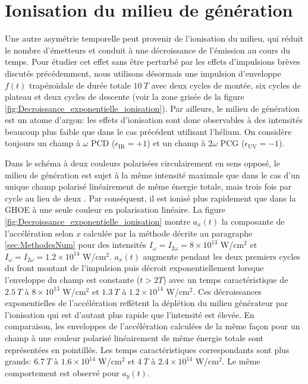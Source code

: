 \section{Ionisation du milieu de génération}
\label{sec:Ionisation}
Une autre asymétrie temporelle peut provenir de l'ionisation du milieu, qui réduit le nombre d'émetteurs et conduit à une décroissance de l'émission au cours du temps. Pour étudier cet effet sans être perturbé par les effets d'impulsions brèves discutés précédemment, nous utilisons désormais une impulsion d'enveloppe $f(t)$ trapézoïdale de durée totale $10 \: T$ avec deux cycles de montée, six cycles de plateau et deux cycles de descente (voir la zone grisée de la figure \ref{fig:Decroissance_exponentielle_ionisation}). Par ailleurs, le milieu de génération est un atome d'argon: les effets d'ionisation sont donc observables à des intensités beaucoup plus faible que dans le cas précédent utilisant l'hélium. On considère toujours un champ à $\omega$ PCD ($\epsilon_{\text{IR}} = +1$) et un champ à 2$\omega$ PCG ($\epsilon_{\text{UV}} = -1$).

Dans le schéma à deux couleurs polarisées circulairement en sens opposé, le milieu de génération est sujet à la même intensité maximale que dans le cas d'un unique champ polarisé linéairement de  même énergie totale, mais trois fois par cycle au lieu de deux . Par conséquent, il est ionisé plus rapidement que dans la GHOE à une seule couleur en polarisation linéaire. La figure \ref{fig:Decroissance_exponentielle_ionisation} montre $a_x(t)$ la composante de l'accélération selon $x$ calculée par la méthode décrite au paragraphe \ref{sec:MethodesNum} pour des intensités $I_\omega = I_{2\omega} = 8 \times 10^{13}$ W/cm$^2$ et $I_\omega = I_{2\omega} = 1.2 \times 10^{14}$ W/cm$^2$. $a_x(t)$ augmente pendant les deux premiers cycles du front montant de l'impulsion puis décroit exponentiellement lorsque l'enveloppe du champ est constante ($t > 2T$) avec un temps caractéristique de $2.5 \: T$ à $8 \times 10^{13}$ W/cm$^2$ et $1.3 \: T$ à $1.2 \times 10^{14}$ W/cm$^2$. Ces décroissances exponentielles de l'accélération reflètent la déplétion du milieu générateur par l'ionisation qui est d'autant plus rapide que l'intensité est élevée. En comparaison, les enveloppes de l'accélération calculées de la même façon pour un champ à une couleur polarisé linéairement de même énergie totale sont représentées en pointillés. Les temps caractéristiques correspondants sont plus grands: $6.7 \: T$ à $1.6 \times 10^{14}$ W/cm$^2$ et $4 \: T$ à $2.4 \times 10^{14}$ W/cm$^2$. Le même comportement est observé pour $a_y (t)$.

